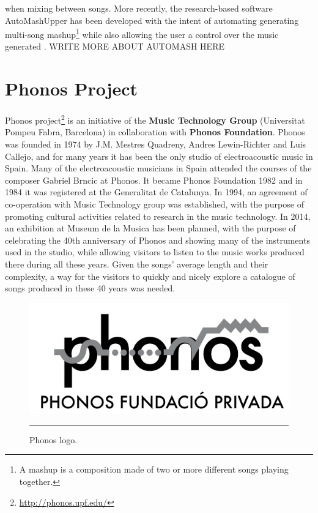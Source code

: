 when mixing between songs. More recently, the research-based software AutoMashUpper has been developed with the intent of automating generating multi-song mashup\footnote{A mashup is a composition made of two or more different songs playing together.} while also allowing the user a control over the music generated \cite{automash14}. WRITE MORE ABOUT AUTOMASH HERE


\section{Phonos Project}
Phonos project\footnote{\url{http://phonos.upf.edu/}} is an initiative of the \textbf{Music Technology Group} (Universitat Pompeu Fabra, Barcelona) in collaboration with \textbf{Phonos Foundation}. Phonos was founded in 1974 by J.M. Mestres Quadreny, Andres Lewin-Richter and Luis Callejo, and for many years it has been the only studio of electroacoustic music in Spain. Many of the electroacoustic musicians in Spain attended the courses of the composer Gabriel Brncic at Phonos. It became Phonos Foundation 1982 and in 1984 it was registered at the Generalitat de Catalunya. In 1994, an agreement of co-operation with Music Technology group was established, with the purpose of promoting cultural activities related to research in the music technology. 
In 2014, an exhibition at Museum de la Musica has been planned, with the purpose of celebrating the 40th anniversary of Phonos and showing many of the instruments used in the studio, while allowing visitors to listen to the music works produced there during all these years. Given the songs' average length and their complexity, a way for the visitors to quickly and nicely explore a catalogue of songs produced in these 40 years was needed.

\begin{figure}[htbp]
  \centering
    \includegraphics{Figures/phonos.png}
    \rule{35em}{0.5pt}
  \caption[Phonos]{Phonos logo.}
  \label{fig:Phonos}
\end{figure}

